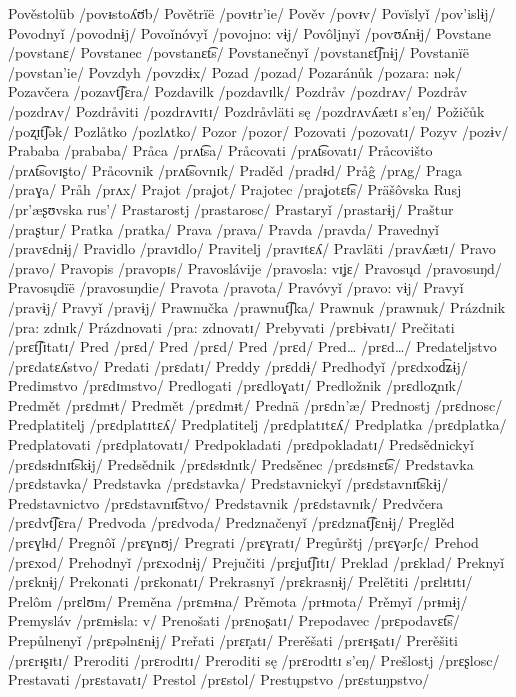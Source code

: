 Pověstolüb /povᵻstoʎʊ̈b/
Povětrïë /povᵻtr’ie/
Pověv /povᵻv/
Povïslyǐ /pov’islɨj/
Povodnyǐ /povodnɨj/
Povoǐnóvyǐ /povojno: vɨj/
Povôljnyǐ /povʊʎnɨj/
Povstane /povstanɛ/
Povstanec /povstanɛt͡s/
Povstanečnyǐ /povstanɛt͡ʃnɨj/
Povstanïë /povstan’ie/
Povzdyh /povzdɨx/
Pozad /pozad/
Pozaránůk /pozara: nək/
Pozavčera /pozavt͡ʃɛra/
Pozdavilk /pozdavɪlk/
Pozdråv /pozdrʌv/
Pozdråv /pozdrʌv/
Pozdråviti /pozdrʌvɪtɪ/
Pozdråvläti sę /pozdrʌvʎætɪ s’eŋ/
Požičůk /poʐɪt͡ʃək/
Pozlåtko /pozlʌtko/
Pozor /pozor/
Pozovati /pozovatɪ/
Pozyv /pozɨv/
Prababa /prababa/
Pråca /prʌt͡sa/
Pråcovati /prʌt͡sovatɪ/
Pråcovišto /prʌt͡sovɪʂto/
Pråcovnik /prʌt͡sovnɪk/
Praděd /pradᵻd/
Pråĝ /prʌg/
Praga /praɣa/
Pråh /prʌx/
Prajot /praʝot/
Prajotec /praʝotɛt͡s/
Präšôvska Rusj /pr’æʂʊvska rus’/
Prastarostj /prastarosc/
Prastaryǐ /prastarɨj/
Praštur /praʂtur/
Pratka /pratka/
Prava /prava/
Pravda /pravda/
Pravednyǐ /pravɛdnɨj/
Pravidlo /pravɪdlo/
Pravitelj /pravɪtɛʎ/
Pravläti /pravʎætɪ/
Pravo /pravo/
Pravopis /pravopɪs/
Pravoslávije /pravosla: vɪʝɛ/
Pravosųd /pravosuŋd/
Pravosųdïë /pravosuŋdie/
Pravota /pravota/
Pravóvyǐ /pravo: vɨj/
Pravyǐ /pravɨj/
Pravyǐ /pravɨj/
Prawnučka /prawnut͡ʃka/
Prawnuk /prawnuk/
Prázdnik /pra: zdnɪk/
Prázdnovati /pra: zdnovatɪ/
Prebyvati /prɛbɨvatɪ/
Prečitati /prɛt͡ʃɪtatɪ/
Pred /prɛd/
Pred /prɛd/
Pred /prɛd/
Pred… /prɛd…/
Predateljstvo /prɛdatɛʎstvo/
Predati /prɛdatɪ/
Preddy /prɛddɨ/
Predhođyǐ /prɛdxod͡ʑɨj/
Predimstvo /prɛdɪmstvo/
Predlogati /prɛdloɣatɪ/
Predložnik /prɛdloʐnɪk/
Predmět /prɛdmᵻt/
Predmět /prɛdmᵻt/
Prednä /prɛdn’æ/
Prednostj /prɛdnosc/
Predplatitelj /prɛdplatɪtɛʎ/
Predplatitelj /prɛdplatɪtɛʎ/
Predplatka /prɛdplatka/
Predplatovati /prɛdplatovatɪ/
Predpokladati /prɛdpokladatɪ/
Predsědnickyǐ /prɛdsᵻdnɪt͡skɨj/
Predsědnik /prɛdsᵻdnɪk/
Predsěnec /prɛdsᵻnɛt͡s/
Predstavka /prɛdstavka/
Predstavka /prɛdstavka/
Predstavnickyǐ /prɛdstavnɪt͡skɨj/
Predstavnictvo /prɛdstavnɪt͡stvo/
Predstavnik /prɛdstavnɪk/
Predvčera /prɛdvt͡ʃɛra/
Predvoda /prɛdvoda/
Predznačenyǐ /prɛdznat͡ʃɛnɨj/
Preglěd /prɛɣlᵻd/
Pregnôǐ /prɛɣnʊj/
Pregrati /prɛɣratɪ/
Pregůrštj /prɛɣərʃc/
Prehod /prɛxod/
Prehodnyǐ /prɛxodnɨj/
Prejučiti /prɛʝut͡ʃɪtɪ/
Preklad /prɛklad/
Preknyǐ /prɛknɨj/
Prekonati /prɛkonatɪ/
Prekrasnyǐ /prɛkrasnɨj/
Prelětiti /prɛlᵻtɪtɪ/
Prelôm /prɛlʊm/
Preměna /prɛmᵻna/
Prěmota /prᵻmota/
Prěmyǐ /prᵻmɨj/
Premysláv /prɛmɨsla: v/
Prenošati /prɛnoʂatɪ/
Prepodavec /prɛpodavɛt͡s/
Prepůlnenyǐ /prɛpəlnɛnɨj/
Preřati /prɛr̝atɪ/
Prerěšati /prɛrᵻʂatɪ/
Prerěšiti /prɛrᵻʂɪtɪ/
Preroditi /prɛrodɪtɪ/
Preroditi sę /prɛrodɪtɪ s’eŋ/
Prešlostj /prɛʂlosc/
Prestavati /prɛstavatɪ/
Prestol /prɛstol/
Prestųpstvo /prɛstuŋpstvo/

